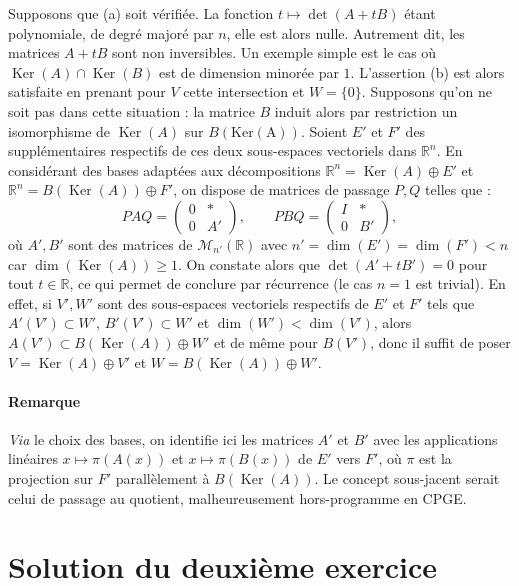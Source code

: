 Supposons que (a) soit vérifiée. La fonction $t \mapsto \det(A + tB)$ étant polynomiale, de degré majoré par $n$, elle est alors nulle. Autrement dit, les matrices $A+tB$ sont non inversibles. Un exemple simple est le cas où $\operatorname{Ker}(A) \cap \operatorname{Ker}(B)$ est de dimension minorée par $1$. L'assertion (b) est alors satisfaite en prenant pour $V$ cette intersection et $W = \{0\}$. Supposons qu'on ne soit pas dans cette situation :  la matrice $B$ induit alors par restriction un isomorphisme de $\operatorname{Ker}(A)$ sur $B(\operatorname{Ker(A)})$.
Soient $E'$ et $F'$ des supplémentaires respectifs de ces deux sous-espaces vectoriels dans $\mathbb R^n$. En considérant des bases adaptées aux décompositions $\mathbb R^n = \operatorname{Ker}(A)\oplus E'$ et $\mathbb R^n = B(\operatorname{Ker}(A))\oplus F'$, on dispose de matrices de passage $P,Q$  telles que :
\[
PAQ = \begin{pmatrix}0 & *\\0 & A'\end{pmatrix},
\qquad
PBQ = \begin{pmatrix}I & *\\0 & B'\end{pmatrix},
\]
où $A',B'$ sont des matrices de $\mathscr M_{n'}(\mathbb R)$ avec $n' = \dim(E') = \dim(F') < n$ car $\dim(\operatorname{Ker}(A)) \geqslant 1$.
On constate alors que $\det(A' + t B') = 0$ pour tout $t\in\mathbb R$, ce qui permet de conclure par récurrence (le cas $n = 1$ est trivial). En effet, si $V',W'$ sont des sous-espaces vectoriels respectifs de $E'$ et $F'$ tels que $A'(V') \subset W'$, $B'(V') \subset W'$ et $\dim(W') < \dim(V')$, alors $A(V') \subset B(\operatorname{Ker}(A)) \oplus W'$ et de même pour $B(V')$, donc il suffit de poser $V = \operatorname{Ker}(A) \oplus V'$ et $W = B(\operatorname{Ker}(A)) \oplus W'$.

\paragraph{Remarque} \textit{Via} le choix des bases, on identifie ici les matrices $A'$ et $B'$ avec les applications linéaires $x \mapsto \pi(A(x))$ et $x \mapsto \pi(B(x))$ de $E'$ vers $F'$, où $\pi$ est la projection sur $F'$ parallèlement à $B(\operatorname{Ker}(A))$. Le concept sous-jacent serait celui de passage au quotient, malheureusement hors-programme en CPGE.

\section{Solution du deuxième exercice}

